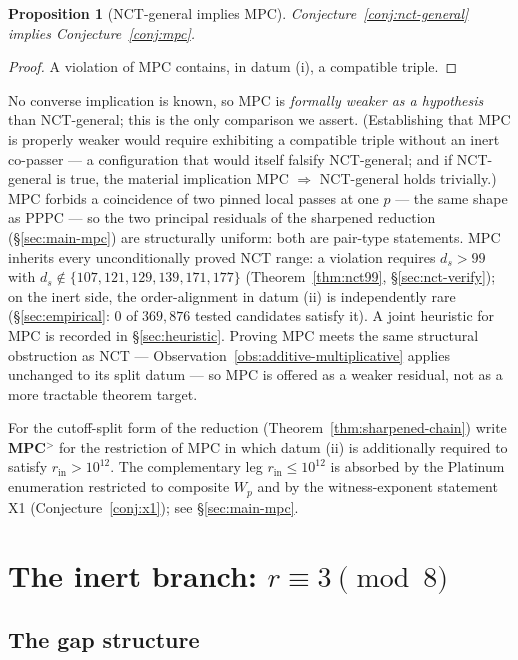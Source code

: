 \documentclass[11pt]{amsart}
\theoremstyle{plain}
\newtheorem{proposition}[theorem]{Proposition}
\theoremstyle{definition}
\theoremstyle{remark}
\numberwithin{equation}{section}
\begin{document}
\begin{proposition}[NCT-general implies MPC]\label{prop:nct-implies-mpc}
Conjecture~\ref{conj:nct-general} implies Conjecture~\ref{conj:mpc}.
\end{proposition}

\begin{proof}
A violation of MPC contains, in datum (i), a compatible triple.
\end{proof}

No converse implication is known, so MPC is \emph{formally weaker as a hypothesis} than NCT-general; this is the only comparison we assert. (Establishing that MPC is properly weaker would require exhibiting a compatible triple without an inert co-passer --- a configuration that would itself falsify NCT-general; and if NCT-general is true, the material implication MPC $\Rightarrow$ NCT-general holds trivially.) MPC forbids a coincidence of two pinned local passes at one $p$ --- the same shape as PPPC --- so the two principal residuals of the sharpened reduction (\S\ref{sec:main-mpc}) are structurally uniform: both are pair-type statements. MPC inherits every unconditionally proved NCT range: a violation requires $d_s > 99$ with $d_s \notin \{107, 121, 129, 139, 171, 177\}$ (Theorem~\ref{thm:nct99}, \S\ref{sec:nct-verify}); on the inert side, the order-alignment in datum (ii) is independently rare (\S\ref{sec:empirical}: $0$ of $369{,}876$ tested candidates satisfy it). A joint heuristic for MPC is recorded in \S\ref{sec:heuristic}. Proving MPC meets the same structural obstruction as NCT --- Observation~\ref{obs:additive-multiplicative} applies unchanged to its split datum --- so MPC is offered as a weaker residual, not as a more tractable theorem target.

For the cutoff-split form of the reduction (Theorem~\ref{thm:sharpened-chain}) write \textbf{MPC$^{>}$} for the restriction of MPC in which datum (ii) is additionally required to satisfy $r_{\mathrm{in}} > 10^{12}$. The complementary leg $r_{\mathrm{in}} \leq 10^{12}$ is absorbed by the Platinum enumeration restricted to composite $W_p$ and by the witness-exponent statement X1 (Conjecture~\ref{conj:x1}); see \S\ref{sec:main-mpc}.

\section{The inert branch: \texorpdfstring{$r \equiv 3 \pmod 8$}{r = 3 mod 8}}\label{sec:inert}

\subsection{The gap structure}\label{sec:gap-structure}
\end{document}

